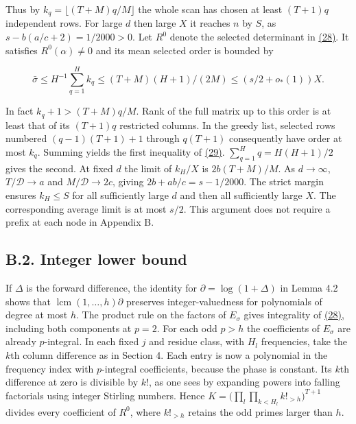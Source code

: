 \documentclass[11pt,a4paper]{article}
\begin{document}
Thus by \(k_q=\lfloor(T+M)q/M\rfloor\) the whole scan has chosen at least \((T+1)q\) independent rows. For large \(d\) then large \(X\) it reaches \(n\) by \(S\), as \(s-b(a/c+2)=1/2000>0\). Let \(R^0\) denote the selected determinant in \hyperref[eq:28]{(28)}. It satisfies \(R^0(\alpha)\ne0\) and its mean selected order is bounded by

\[
 \bar\sigma\le H^{-1}\sum_{q=1}^H k_q
 \le (T+M)(H+1)/(2M)\le (s/2+o_*(1))X .                                 \tag{29}\label{eq:29}
\]

In fact \(k_q+1>(T+M)q/M\). Rank of the full matrix up to this order is at least that of its \((T+1)q\) restricted columns. In the greedy list, selected rows numbered \((q-1)(T+1)+1\) through \(q(T+1)\) consequently have order at most \(k_q\). Summing yields the first inequality of \hyperref[eq:29]{(29)}. \(\sum_{q=1}^Hq=H(H+1)/2\) gives the second. At fixed \(d\) the limit of \(k_H/X\) is \(2b(T+M)/M\). As \(d\to\infty\), \(T/\mathscr D\to a\) and \(M/\mathscr D\to2c\), giving \(2b+ab/c=s-1/2000\). The strict margin ensures \(k_H\le S\) for all sufficiently large \(d\) and then all sufficiently large \(X\). The corresponding average limit is at most \(s/2\). This argument does not require a prefix at each node in Appendix B.

\subsection{B.2. Integer lower bound}\label{b.2.-integer-lower-bound}

If \(\Delta\) is the forward difference, the identity for \(\partial=\log(1+\Delta)\) in Lemma 4.2 shows that \(\operatorname{lcm}(1,\ldots,h)\partial\) preserves integer-valuedness for polynomials of degree at most \(h\). The product rule on the factors of \(E_\sigma\) gives integrality of \hyperref[eq:28]{(28)}, including both components at \(p=2\). For each odd \(p>h\) the coefficients of \(E_\sigma\) are already \(p\)-integral. In each fixed \(j\) and residue class, with \(H_l\) frequencies, take the \(k\)th column difference as in Section 4. Each entry is now a polynomial in the frequency index with \(p\)-integral coefficients, because the phase is constant. Its \(k\)th difference at zero is divisible by \(k!\), as one sees by expanding powers into falling factorials using integer Stirling numbers. Hence \(K=\big(\prod_l\prod_{k<H_l}k!_{>h}\big)^{T+1}\) divides every coefficient of \(R^0\), where \(k!_{>h}\) retains the odd primes larger than \(h\).
\end{document}
